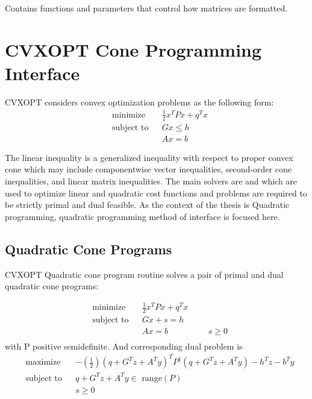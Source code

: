 \subsubsection*{}
Contains functions and parameters that control how matrices are formatted.

\section{CVXOPT Cone Programming Interface}
CVXOPT considers convex optimization problems as the following form:
\begin{equation*}
\begin{aligned}
& \text{minimize}
& & \frac{1}{2}x^{T}Px+q^{T}x \\
& \text{subject to} & &  Gx \leqslant h\\
& & &  Ax = b
\end{aligned}
\end{equation*}

The linear inequality is a generalized inequality with respect to proper convex cone which may include componentwise vector inequalities, second-order cone inequalities, and linear matrix inequalities. The main solvers are  and which are used to optimize linear and quadratic cost functions and problems are required to be strictly primal and dual feasible. As the context of the thesis is Quadratic programming, quadratic programming method of  interface is focused here.

\subsection{Quadratic Cone Programs}
CVXOPT Quadratic cone program routine solves a pair of primal and dual quadratic cone programs:

\begin{equation*}
\begin{aligned}
& \text{minimize}
& & \frac{1}{2}x^{T}Px+q^{T}x \\
& \text{subject to} & &  Gx + s = h\\
& & &  Ax = b
& & &  s\geqslant 0\\
\end{aligned}
\end{equation*}
with P positive semidefinite. And corresponding dual problem is
\begin{equation*}
	\begin{aligned}
		& \text{maximize}
& & -(\frac{1}{2})(q+G^Tz+A^Ty)^{T}P^{\dagger}(q+G^Tz+A^Ty)-h^Tz-b^Ty\\
& \text{subject to} & &  q+G^Tz+A^Ty \in \text{ range}(P)\\
& & &  s\geqslant 0\\
	\end{aligned}
\end{equation*}

